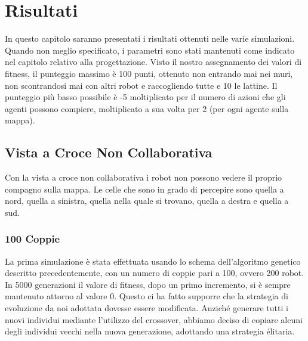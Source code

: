 \chapter{Risultati}
In questo capitolo saranno presentati i risultati ottenuti nelle varie
simulazioni. Quando non meglio specificato, i parametri sono stati mantenuti
come indicato nel capitolo relativo alla progettazione.\newline
Visto il nostro assegnamento dei valori di fitness, il punteggio massimo è 100
punti, ottenuto non entrando mai nei muri, non scontrandosi mai con altri robot
e raccogliendo tutte e 10 le lattine. Il punteggio più basso possibile è -5
moltiplicato per il numero di azioni che gli agenti possono compiere,
moltiplicato a sua volta per 2 (per ogni agente sulla mappa).



\section{Vista a Croce Non Collaborativa}
Con la vista a croce non collaborativa i robot non possono vedere il proprio
compagno sulla mappa. Le celle che sono in grado di percepire sono quella a
nord, quella a sinistra, quella nella quale si trovano, quella a destra e quella
a sud.

\subsection{100 Coppie}
La prima simulazione è stata effettuata usando lo schema dell'algoritmo genetico
descritto precedentemente, con un numero di coppie pari a 100, ovvero 200
robot.\newline
In 5000 generazioni il valore di fitness, dopo un primo incremento, si è sempre
mantenuto attorno al valore 0. Questo ci ha fatto supporre che la strategia di
evoluzione da noi adottata dovesse essere modificata. Anziché generare tutti i
nuovi individui mediante l'utilizzo del crossover, abbiamo deciso di copiare
alcuni degli individui vecchi nella nuova generazione, adottando una strategia
élitaria.

